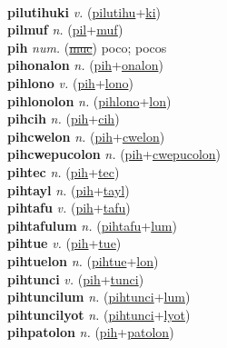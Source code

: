  \label{pilutihulon} \\
\textbf{pilutihuki} \textit{v.} (\hyperref[pilutihu]{pilutihu}+\hyperref[ki]{ki})
 \label{pilutihuki} \\
\textbf{pilmuf} \textit{n.} (\hyperref[pil]{pil}+\hyperref[muf]{muf})
 \label{pilmuf} \\
\textbf{pih} \textit{num.} (\hyperref[muc]{\sout{muc}})
poco; pocos \label{pih} \\
\textbf{pihonalon} \textit{n.} (\hyperref[pih]{pih}+\hyperref[onalon]{onalon})
 \label{pihonalon} \\
\textbf{pihlono} \textit{v.} (\hyperref[pih]{pih}+\hyperref[lono]{lono})
 \label{pihlono} \\
\textbf{pihlonolon} \textit{n.} (\hyperref[pihlono]{pihlono}+\hyperref[lon]{lon})
 \label{pihlonolon} \\
\textbf{pihcih} \textit{n.} (\hyperref[pih]{pih}+\hyperref[cih]{cih})
 \label{pihcih} \\
\textbf{pihcwelon} \textit{n.} (\hyperref[pih]{pih}+\hyperref[cwelon]{cwelon})
 \label{pihcwelon} \\
\textbf{pihcwepucolon} \textit{n.} (\hyperref[pih]{pih}+\hyperref[cwepucolon]{cwepucolon})
 \label{pihcwepucolon} \\
\textbf{pihtec} \textit{n.} (\hyperref[pih]{pih}+\hyperref[tec]{tec})
 \label{pihtec} \\
\textbf{pihtayl} \textit{n.} (\hyperref[pih]{pih}+\hyperref[tayl]{tayl})
 \label{pihtayl} \\
\textbf{pihtafu} \textit{v.} (\hyperref[pih]{pih}+\hyperref[tafu]{tafu})
 \label{pihtafu} \\
\textbf{pihtafulum} \textit{n.} (\hyperref[pihtafu]{pihtafu}+\hyperref[lum]{lum})
 \label{pihtafulum} \\
\textbf{pihtue} \textit{v.} (\hyperref[pih]{pih}+\hyperref[tue]{tue})
 \label{pihtue} \\
\textbf{pihtuelon} \textit{n.} (\hyperref[pihtue]{pihtue}+\hyperref[lon]{lon})
 \label{pihtuelon} \\
\textbf{pihtunci} \textit{v.} (\hyperref[pih]{pih}+\hyperref[tunci]{tunci})
 \label{pihtunci} \\
\textbf{pihtuncilum} \textit{n.} (\hyperref[pihtunci]{pihtunci}+\hyperref[lum]{lum})
 \label{pihtuncilum} \\
\textbf{pihtuncilyot} \textit{n.} (\hyperref[pihtunci]{pihtunci}+\hyperref[lyot]{lyot})
 \label{pihtuncilyot} \\
\textbf{pihpatolon} \textit{n.} (\hyperref[pih]{pih}+\hyperref[patolon]{patolon})
